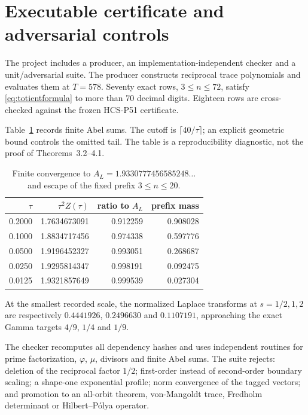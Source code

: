 \section{Executable certificate and adversarial controls}

The project includes a producer, an implementation-independent checker and a
unit/adversarial suite.  The producer constructs reciprocal trace polynomials
and evaluates them at $T=578$.  Seventy exact rows, $3\le n\le72$, satisfy
\eqref{eq:totientformula} to more than 70 decimal digits.  Eighteen rows are
cross-checked against the frozen HCS-P51 certificate.

Table~\ref{tab:abel} records finite Abel sums.  The cutoff is
$\lceil40/\tau\rceil$; an explicit geometric bound controls the omitted tail.
The table is a reproducibility diagnostic, not the proof of
Theorems~3.2--4.1.

\begin{table}[ht]
\centering
\caption{Finite convergence to $A_L=1.9330777456585248\ldots$ and escape
of the fixed prefix $3\le n\le20$.}
\label{tab:abel}
\begin{tabular}{rrrr}
\toprule
$\tau$ & $\tau^2Z(\tau)$ & ratio to $A_L$ & prefix mass\\
\midrule
0.2000 & 1.7634673091 & 0.912259 & 0.908028\\
0.1000 & 1.8834717456 & 0.974338 & 0.597776\\
0.0500 & 1.9196452327 & 0.993051 & 0.268687\\
0.0250 & 1.9295814347 & 0.998191 & 0.092475\\
0.0125 & 1.9321857649 & 0.999539 & 0.027304\\
\bottomrule
\end{tabular}
\end{table}

At the smallest recorded scale, the normalized Laplace transforms at
$s=1/2,1,2$ are respectively
$0.4441926$, $0.2496630$ and $0.1107191$, approaching the exact Gamma targets
$4/9$, $1/4$ and $1/9$.

The checker recomputes all dependency hashes and uses independent routines
for prime factorization, $\varphi$, $\mu$, divisors and finite Abel sums.  The
suite rejects: deletion of the reciprocal factor $1/2$; first-order instead
of second-order boundary scaling; a shape-one exponential profile; norm
convergence of the tagged vectors; and promotion to an all-orbit theorem,
von-Mangoldt trace, Fredholm determinant or Hilbert--P\'olya operator.
